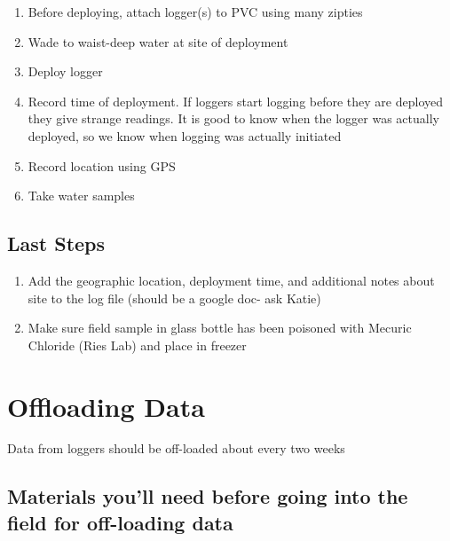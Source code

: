 \documentclass[
  letterpaper,
  DIV=11,
  numbers=noendperiod]{scrreprt}
\begin{document}
\begin{enumerate}
\def\labelenumi{\arabic{enumi}.}
\item
  Before deploying, attach logger(s) to PVC using many zipties
\item
  Wade to waist-deep water at site of deployment
\item
  Deploy logger
\item
  Record time of deployment. If loggers start logging before they are
  deployed they give strange readings. It is good to know when the
  logger was actually deployed, so we know when logging was actually
  initiated
\item
  Record location using GPS
\item
  Take water samples
\end{enumerate}

\hypertarget{last-steps}{%
\subsection*{\texorpdfstring{\textbf{Last
Steps}}{Last Steps}}\label{last-steps}}

\begin{enumerate}
\def\labelenumi{\arabic{enumi}.}
\item
  Add the geographic location, deployment time, and additional notes
  about site to the log file (should be a google doc- ask Katie)
\item
  Make sure field sample in glass bottle has been poisoned with Mecuric
  Chloride (Ries Lab) and place in freezer
\end{enumerate}

\hypertarget{offloading-data}{%
\section*{\texorpdfstring{\textbf{Offloading
Data}}{Offloading Data}}\label{offloading-data}}

Data from loggers should be off-loaded about every two weeks

\hypertarget{materials-youll-need-before-going-into-the-field-for-off-loading-data}{%
\subsection*{\texorpdfstring{\textbf{Materials you'll need before going
into the field for off-loading
data}}{Materials you'll need before going into the field for off-loading data}}\label{materials-youll-need-before-going-into-the-field-for-off-loading-data}}
\end{document}
